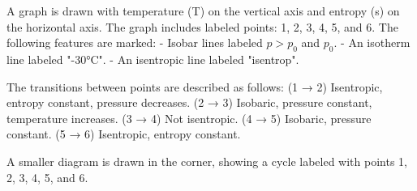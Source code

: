 A graph is drawn with temperature (T) on the vertical axis and entropy (s) on the horizontal axis. The graph includes labeled points: 1, 2, 3, 4, 5, and 6. The following features are marked:  
- Isobar lines labeled \( p > p_0 \) and \( p_0 \).  
- An isotherm line labeled "-30°C".  
- An isentropic line labeled "isentrop".  

The transitions between points are described as follows:  
(1 → 2) Isentropic, entropy constant, pressure decreases.  
(2 → 3) Isobaric, pressure constant, temperature increases.  
(3 → 4) Not isentropic.  
(4 → 5) Isobaric, pressure constant.  
(5 → 6) Isentropic, entropy constant.  

A smaller diagram is drawn in the corner, showing a cycle labeled with points 1, 2, 3, 4, 5, and 6.